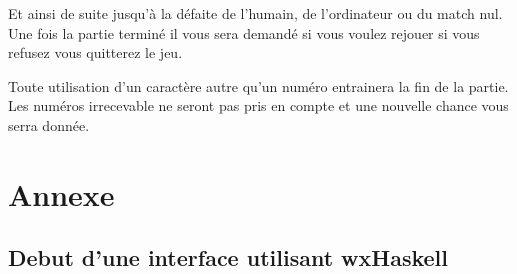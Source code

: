 \documentclass[a4paper]{article}
\begin{document}
Et ainsi de suite jusqu'à la défaite de l'humain, de l'ordinateur ou du match nul.\\
Une fois la partie terminé il vous sera demandé si vous voulez rejouer si vous refusez vous quitterez le jeu. 

Toute utilisation d'un caractère autre qu'un numéro entrainera la fin de la partie. Les numéros irrecevable ne seront pas pris en compte et une nouvelle chance vous serra donnée. 

\newpage
\section{Annexe} %
\subsection*{Debut d'une interface utilisant wxHaskell}




\end{document}
